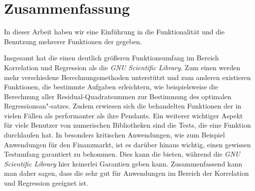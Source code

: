 \section{Zusammenfassung}

In dieser Arbeit haben wir eine Einführung in die Funktionalität und die Benutzung mehrerer Funktionen der \naglib gegeben.

Insgesamt hat die \naglib einen deutlich größeren Funktionsumfang im Bereich Korrelation und Regression als die {\it GNU Scientific Library}.
Zum einen werden mehr verschiedene Berechnungsmethoden unterstützt und zum anderen existieren Funktionen, die bestimmte Aufgaben erleichtern, wie beispielsweise die Berechnung aller Residual-Quadratsummen zur Bestimmung des optimalen Regressionsan"-satzes.
Zudem erwiesen sich die behandelten Funktionen der \naglib in vielen Fällen als performanter als ihre Pendants.
Ein weiterer wichtiger Aspekt für viele Benutzer von numerischen Bibliotheken sind die Tests, die eine Funktion durchlaufen hat.
In besonders kritischen Anwendungen, wie zum Beispiel Anwendungen für den Finanzmarkt, ist es darüber hinaus wichtig, einen gewissen Testumfang garantiert zu bekommen.
Dies kann die \naglib bieten, während die {\it GNU Scientific Library} hier keinerlei Garantien geben kann.
Zusammenfassend kann man daher sagen, dass die \naglib sehr gut für Anwendungen im Bereich der Korrelation und Regression geeignet ist.


